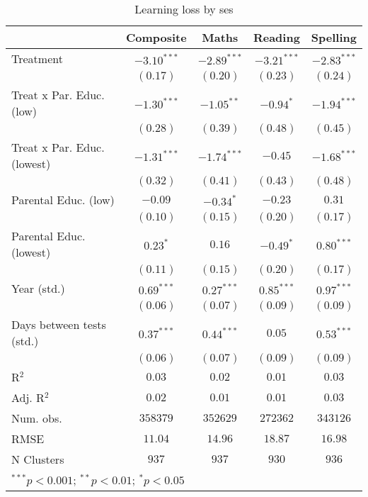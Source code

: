 
\begin{table}
\begin{center}
\begin{tabular}{l c c c c}
\hline
 & Composite & Maths & Reading & Spelling \\
\hline
Treatment                   & $-3.10^{***}$ & $-2.89^{***}$ & $-3.21^{***}$ & $-2.83^{***}$ \\
                            & $(0.17)$      & $(0.20)$      & $(0.23)$      & $(0.24)$      \\
Treat x Par. Educ. (low)    & $-1.30^{***}$ & $-1.05^{**}$  & $-0.94^{*}$   & $-1.94^{***}$ \\
                            & $(0.28)$      & $(0.39)$      & $(0.48)$      & $(0.45)$      \\
Treat x Par. Educ. (lowest) & $-1.31^{***}$ & $-1.74^{***}$ & $-0.45$       & $-1.68^{***}$ \\
                            & $(0.32)$      & $(0.41)$      & $(0.43)$      & $(0.48)$      \\
Parental Educ. (low)        & $-0.09$       & $-0.34^{*}$   & $-0.23$       & $0.31$        \\
                            & $(0.10)$      & $(0.15)$      & $(0.20)$      & $(0.17)$      \\
Parental Educ. (lowest)     & $0.23^{*}$    & $0.16$        & $-0.49^{*}$   & $0.80^{***}$  \\
                            & $(0.11)$      & $(0.15)$      & $(0.20)$      & $(0.17)$      \\
Year (std.)                 & $0.69^{***}$  & $0.27^{***}$  & $0.85^{***}$  & $0.97^{***}$  \\
                            & $(0.06)$      & $(0.07)$      & $(0.09)$      & $(0.09)$      \\
Days between tests (std.)   & $0.37^{***}$  & $0.44^{***}$  & $0.05$        & $0.53^{***}$  \\
                            & $(0.06)$      & $(0.07)$      & $(0.09)$      & $(0.09)$      \\
\hline
R$^2$                       & $0.03$        & $0.02$        & $0.01$        & $0.03$        \\
Adj. R$^2$                  & $0.02$        & $0.01$        & $0.01$        & $0.03$        \\
Num. obs.                   & $358379$      & $352629$      & $272362$      & $343126$      \\
RMSE                        & $11.04$       & $14.96$       & $18.87$       & $16.98$       \\
N Clusters                  & $937$         & $937$         & $930$         & $936$         \\
\hline
\multicolumn{5}{l}{\scriptsize{$^{***}p<0.001$; $^{**}p<0.01$; $^{*}p<0.05$}}
\end{tabular}
\caption{Learning loss by ses}
\label{tableses}
\end{center}
\end{table}
